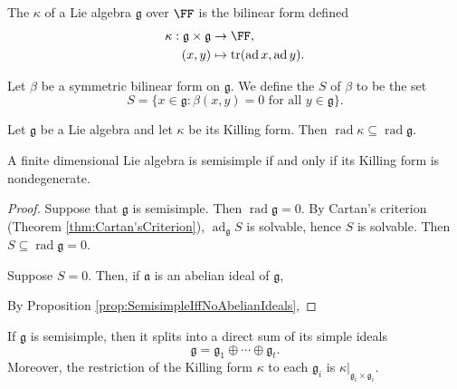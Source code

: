 \documentclass{article}
\DeclareMathOperator{\tr}{tr}
\DeclareMathOperator{\rad}{rad}
\newcommand*\ad{\operatorname{ad}}
\newcommand*\frka{{\ensuremath{\mathfrak{a}}}}
\newcommand*\frkg{{\ensuremath{\mathfrak{g}}}}
\begin{document}
\begin{definition}
    The  $\kappa$ of a Lie algebra $\frkg$ over $\FF$ is the bilinear form defined
    \begin{align*}
        \kappa:
        \frkg \times \frkg 
        &\to
        \FF, \\
        (x, y)
        &\mapsto
        \tr(\ad x, \ad y).
    \end{align*}
\end{definition}

\begin{definition}
    Let $\beta$ be a symmetric bilinear form on $\frkg$.
    We define the  $S$ of $\beta$ to be the set
    \[
        S
        =
        \{x \in \frkg: \beta(x,y) = 0 \text{ for all } y \in \frkg\}.
    \]
\end{definition}

\begin{lemma}
    Let $\frkg$ be a Lie algebra and let $\kappa$ be its Killing form.
    Then $\rad \kappa \subseteq \rad \frkg$.
\end{lemma}

\begin{proposition}
    \label{prop:SemisimpleIffNondegenerateKillingForm}
    A finite dimensional Lie algebra is semisimple if and only if its Killing form is nondegenerate.
\end{proposition}

\begin{proof}
    Suppose that $\frkg$ is semisimple.
    Then $\rad \frkg = 0$.
    By Cartan's criterion (Theorem \ref{thm:Cartan'sCriterion}), $\ad_\frkg S$ is solvable, hence $S$ is solvable.
    Then $S \subseteq \rad \frkg = 0$.

    Suppose $S = 0$.
    Then, if $\frka$ is an abelian ideal of $\frkg$,
    
    By Proposition \ref{prop:SemisimpleIffNoAbelianIdeals},
\end{proof}

\begin{theorem}
    If $\frkg$ is semisimple, then it splits into a direct sum of its simple ideals
    \[
        \frkg
        =
        \frkg_1 \oplus \cdots \oplus \frkg_t.
    \]
    Moreover, the restriction of the Killing form $\kappa$ to each $\frkg_i$ is $\kappa|_{\frkg_i\times\frkg_i}$.
\end{theorem}
\end{document}
